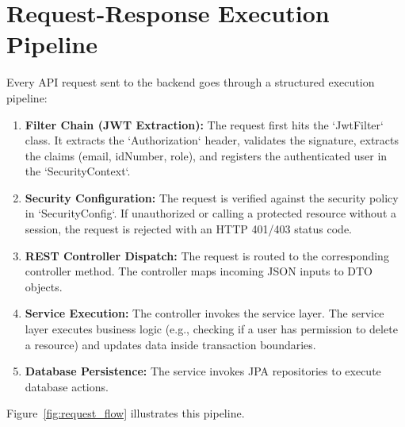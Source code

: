 \section{Request-Response Execution Pipeline}
Every API request sent to the backend goes through a structured execution pipeline:
\begin{enumerate}
    \item \textbf{Filter Chain (JWT Extraction):} The request first hits the `JwtFilter` class. It extracts the `Authorization` header, validates the signature, extracts the claims (email, idNumber, role), and registers the authenticated user in the `SecurityContext`.
    \item \textbf{Security Configuration:} The request is verified against the security policy in `SecurityConfig`. If unauthorized or calling a protected resource without a session, the request is rejected with an HTTP 401/403 status code.
    \item \textbf{REST Controller Dispatch:} The request is routed to the corresponding controller method. The controller maps incoming JSON inputs to DTO objects.
    \item \textbf{Service Execution:} The controller invokes the service layer. The service layer executes business logic (e.g., checking if a user has permission to delete a resource) and updates data inside transaction boundaries.
    \item \textbf{Database Persistence:} The service invokes JPA repositories to execute database actions.
\end{enumerate}

Figure~\ref{fig:request_flow} illustrates this pipeline.

